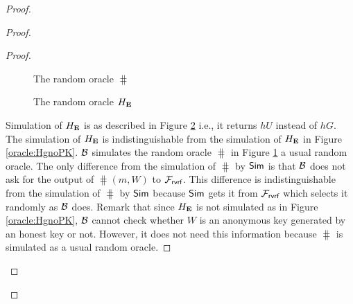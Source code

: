 \begin{proof}
\begin{proof}
\begin{proof}
\begin{figure}
				\noindent{}	
				\caption{The random oracle $ \hash $}
				\label{oracle:HbyB}
			\end{figure}
			
			\begin{figure}
				\centering
				
				\noindent{}	
				\caption{The random oracle $ H_{\mathbf{E}} $}
				\label{oracle:HgbyB}
			\end{figure}
			
			Simulation of $ H_{\mathbf{E}} $ is as described in Figure \ref{oracle:HgbyB} i.e., it returns $ hU $ instead of $ hG $. The simulation of $ H_{\mathbf{E}} $ is indistinguishable from the simulation of $ H_{\mathbf{E}} $ in Figure \ref{oracle:HgnoPK}. 
			$ \mathcal{B} $ simulates the random oracle $ \hash $ in Figure \ref{oracle:HbyB} a usual random oracle. The only difference from the simulation of $ \hash $ by $ \mathsf{Sim} $ is that $ \mathcal{B} $ does not ask for the output of $ \hash(m,W) $ to $ \mathcal{F}_{\textsf{rvrf}} $. This difference is indistinguishable from the simulation of $ \hash $ by $ \mathsf{Sim} $ because $ \mathsf{Sim} $ gets it from $ \mathcal{F}_{\textsf{rvrf}} $ which selects it randomly as $ \mathcal{B}  $ does. Remark that since $ H_{\mathbf{E}} $ is not simulated as in Figure \ref{oracle:HgnoPK}, $ \mathcal{B} $ cannot check whether $ W $ is an anonymous key generated by an honest key or not.  However, it does not need this information because $ \hash $ is simulated as a usual random oracle.
			

\end{proof}
\end{proof}
\end{proof}
